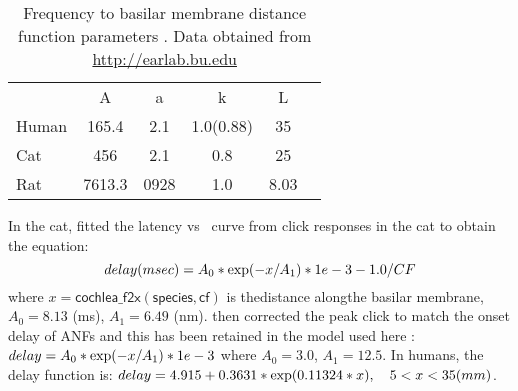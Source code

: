 \begin{table}[ht]
  \centering
  \begin{tabular}{lccccc}
    \hline
    &   A   &   a  &     k     & L \\
    Human & 165.4 &  2.1 & 1.0(0.88) & 35\\
    Cat  &  456  &  2.1 &    0.8    & 25 \\
    Rat  & 7613.3& 0928 &    1.0    & 8.03 \\
    \hline
  \end{tabular}
  \caption[Basilar membrane frequency-distance function parameters]{Frequency to basilar membrane distance function parameters \citep{FitzGeraldBurkittEtAl:2001}. Data obtained from \url{http://earlab.bu.edu} \label{tab:f2x}}
\end{table}

In the cat, \citet{CarneyYin:1988} fitted the latency vs \CF~curve from click
responses in the cat to obtain the equation: 
\begin{equation}
  \label{eq:delay}
   delay (msec) = A_0 * {\rm exp}(-x / A_1 ) * 1e-3 - 1.0/CF
\end{equation}
\noindent where $x = \mathsf{cochlea\_f2x(species, cf)}$ is
thedistance alongthe basilar membrane, $A_0 = 8.13$ (ms), $A_1 = 6.49$
(nm). \citet{HeinzZhangEtAl:2001} then corrected the peak click to match the
onset delay of ANFs and this has been retained in the model used here
\citep{ZilanyBruceEtAl:2009}: \(delay = A_0 * {\rm exp}(-x / A_1) * 1e-3 \)
where $A_0 = 3.0$, $A_1 = 12.5$. In humans, the delay function is: \( delay =
4.915 + 0.3631 * {\rm exp}(0.11324*x),\quad  5<x<35 (mm) \).


